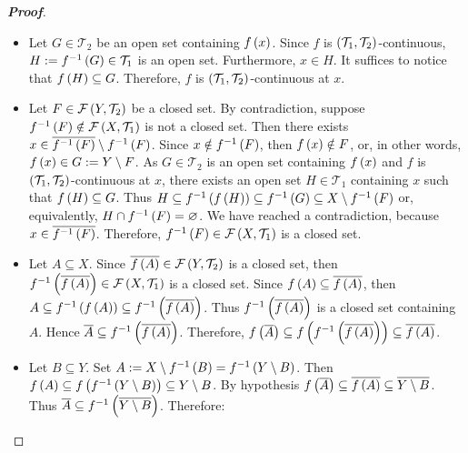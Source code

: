 \begin{proposition}
  \begin{proof}[\rm\textbf{Proof}]
    \hfill
    \begin{itemize}
      \item[\boxed{1\Rightarrow2}] Let $G\in\mathcal{T}_2$ be an open set containing $f\left(x\right)$. Since $f$ is $\left(\mathcal{T}_1,\mathcal{T}_2\right)$-continuous, $H:=f^{-1}\left(G\right)\in\mathcal{T}_1$ is an open set. Furthermore, $x\in H$. It suffices to notice that $f\left(H\right)\subseteq G$. Therefore, $f$ is $\left(\mathcal{T}_1,\mathcal{T}_2\right)$-continuous at $x$. 
      \item[\boxed{2\Rightarrow3}] Let $F\in\mathcal{F}\left(Y,\mathcal{T}_2\right)$ be a closed set. By contradiction, suppose $f^{-1}\left(F\right)\notin\mathcal{F}\left(X,\mathcal{T}_1\right)$ is not a closed set. Then there exists $x\in\overline{f^{-1}\left(F\right)}\setminus f^{-1}\left(F\right)$. Since $x\notin f^{-1}\left(F\right)$, then $f\left(x\right)\notin F$, or, in other words, $f\left(x\right)\in G:=Y\setminus F$. As $G\in\mathcal{T}_2$ is an open set containing $f\left(x\right)$ and $f$ is $\left(\mathcal{T}_1,\mathcal{T}_2\right)$-continuous at $x$, there exists an open set $H\in\mathcal{T}_1$ containing $x$ such that $f\left(H\right)\subseteq G$. Thus $H\subseteq f^{-1}\left(f\left(H\right)\right)\subseteq f^{-1}\left(G\right)\subseteq X\setminus f^{-1}\left(F\right)$ or, equivalently, $H\cap f^{-1}\left(F\right)=\varnothing$. We have reached a contradiction, because $x\in\overline{f^{-1}\left(F\right)}$. Therefore, $f^{-1}\left(F\right)\in\mathcal{F}\left(X,\mathcal{T}_1\right)$ is a closed set.
      \item[\boxed{3\Rightarrow4}] Let $A\subseteq X$. Since $\overline{f\left(A\right)}\in\mathcal{F}\left(Y,\mathcal{T}_2\right)$ is a closed set, then $f^{-1}\left(\overline{f\left(A\right)}\right)\in\mathcal{F}\left(X,\mathcal{T}_1\right)$ is a closed set. Since $f\left(A\right)\subseteq\overline{f\left(A\right)}$, then $A\subseteq f^{-1}\left(f\left(A\right)\right)\subseteq f^{-1}\left(\overline{f\left(A\right)}\right)$. Thus $f^{-1}\left(\overline{f\left(A\right)}\right)$ is a closed set containing $A$. Hence $\overline{A}\subseteq f^{-1}\left(\overline{f\left(A\right)}\right)$. Therefore, $f\left(\overline{A}\right)\subseteq f\left(f^{-1}\left(\overline{f\left(A\right)}\right)\right)\subseteq\overline{f\left(A\right)}$. 
      \item[\boxed{4\Rightarrow5}] Let $B\subseteq Y$. Set $A:=X\setminus f^{-1}\left(B\right)=f^{-1}\left(Y\setminus B\right)$. Then $f\left(A\right)\subseteq f\left(f^{-1}\left(Y\setminus B\right)\right)\subseteq Y\setminus B$. By hypothesis $f\left(\overline{A}\right)\subseteq \overline{f\left(A\right)}\subseteq\overline{Y\setminus B}$. Thus $\overline{A}\subseteq f^{-1}\left(\overline{Y\setminus B}\right)$. Therefore:
      

\end{itemize}
\end{proof}
\end{proposition}
